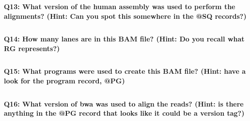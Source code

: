 \documentclass[11pt]{article}
\makeatletter
\newcommand{\boxspacing}{\kern\kvtcb@left@rule\kern\kvtcb@boxsep}
\newcommand{\prompt}[4]{
        {\ttfamily\llap{{\color{blue}\LARGE\faKeyboardO\hspace{3pt}#4}}\vspace{-\baselineskip}}
    }
\makeatother
\begin{document}
    \textbf{Q13: What version of the human assembly was used to perform the
alignments? (Hint: Can you spot this somewhere in the @SQ records?)}

    \begin{tcolorbox}[breakable, size=fbox, boxrule=1pt, pad at break*=1mm,colback=cellbackground, colframe=cellborder]
\prompt{In}{incolor}{ }{\boxspacing}
\begin{Verbatim}[commandchars=\\\{\}]

\end{Verbatim}
\end{tcolorbox}

    \textbf{Q14: How many lanes are in this BAM file? (Hint: Do you recall
what RG represents?)}

    \begin{tcolorbox}[breakable, size=fbox, boxrule=1pt, pad at break*=1mm,colback=cellbackground, colframe=cellborder]
\prompt{In}{incolor}{ }{\boxspacing}
\begin{Verbatim}[commandchars=\\\{\}]

\end{Verbatim}
\end{tcolorbox}

    \textbf{Q15: What programs were used to create this BAM file? (Hint:
have a look for the program record, @PG)}

    \begin{tcolorbox}[breakable, size=fbox, boxrule=1pt, pad at break*=1mm,colback=cellbackground, colframe=cellborder]
\prompt{In}{incolor}{ }{\boxspacing}
\begin{Verbatim}[commandchars=\\\{\}]

\end{Verbatim}
\end{tcolorbox}

    \textbf{Q16: What version of bwa was used to align the reads? (Hint: is
there anything in the @PG record that looks like it could be a version
tag?)}

    \begin{tcolorbox}[breakable, size=fbox, boxrule=1pt, pad at break*=1mm,colback=cellbackground, colframe=cellborder]
\prompt{In}{incolor}{ }{\boxspacing}
\begin{Verbatim}[commandchars=\\\{\}]

\end{Verbatim}
\end{tcolorbox}
\end{document}
